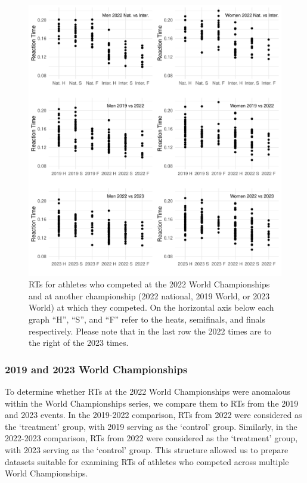\documentclass[12pt, letterpaper]{article}
\begin{document}
\begin{figure}[tbp]
  \centering
  \includegraphics[width=\textwidth]{RankScatterPlots}
  \caption{RTs for athletes who competed at the 2022 World Championships
    and at another championship (2022 national, 2019 World, or 2023
    World) at which they competed. On the horizontal
    axis below each graph ``H'', ``S'', and ``F'' refer to the heats,
    semifinals, and  finals respectively. Please note that in the last
    row the 2022 times are to the right of the 2023 times.}
  \label{fig:RankScatterplots}
\end{figure}

\subsubsection{2019 and 2023 World Championships}
\label{sec:data2019}

To determine whether RTs at the 2022 World Championships were
anomalous within the World Championships series, we compare them to
RTs from the 2019 and 2023 events. In the 2019-2022 comparison,
RTs from 2022 were considered as the `treatment' group, with
2019 serving as the `control' group. Similarly, in the 2022-2023
comparison, RTs from 2022 were considered as the `treatment'
group, with 2023 serving as the `control' group. This structure allowed
us to prepare datasets suitable for examining RTs of athletes
who competed across multiple World Championships.
\end{document}
